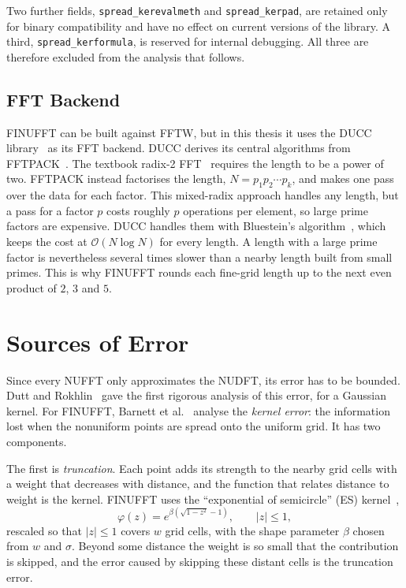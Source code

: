 Two further fields, \texttt{spread\_kerevalmeth} and \texttt{spread\_kerpad},
are retained only for binary compatibility and have no effect on current
versions of the library. A third, \texttt{spread\_kerformula}, is reserved for
internal debugging. All three are therefore excluded from the analysis that
follows.

\subsection{FFT Backend}
\label{sec:related_ducc}

FINUFFT can be built against FFTW, but in this thesis it uses the DUCC library~\cite{ducc} as its FFT backend. DUCC derives its central algorithms from FFTPACK~\cite{fftpack}. The textbook radix-2 FFT~\cite{cooley1965} requires the length to be a power of two. FFTPACK instead factorises the length, $N = p_1 p_2 \cdots p_k$, and makes one pass over the data for each factor. This mixed-radix approach handles any length, but a pass for a factor $p$ costs roughly $p$ operations per element, so large prime factors are expensive. DUCC handles them with Bluestein's algorithm~\cite{bluestein1970}, which keeps the cost at $\mathcal{O}(N \log N)$ for every length. A length with a large prime factor is nevertheless several times slower than a nearby length built from small primes. This is why FINUFFT rounds each fine-grid length up to the next even product of $2$, $3$ and $5$.

\section{Sources of Error}
\label{sec:nufft_error}

Since every NUFFT only approximates the NUDFT, its error has to be bounded.
Dutt and Rokhlin~\cite{dutt1993} gave the first rigorous analysis of this
error, for a Gaussian kernel. For FINUFFT, Barnett et
al.~\cite{barnett2019,barnett2021aliasing} analyse the \emph{kernel error}:
the information lost when the nonuniform points are spread onto the uniform
grid. It has two components.

The first is \emph{truncation}. Each point adds its strength to the nearby
grid cells with a weight that decreases with distance, and the function that
relates distance to weight is the kernel. FINUFFT uses the \enquote{exponential
of semicircle} (ES) kernel~\cite{barnett2019},
\begin{equation}
    \varphi(z) = e^{\beta\left(\sqrt{1 - z^2} - 1\right)}, \qquad |z| \le 1,
    \label{eq:es_kernel}
\end{equation}
rescaled so that $|z| \le 1$ covers $w$ grid cells, with the shape parameter
$\beta$ chosen from $w$ and $\sigma$. Beyond some distance the weight is so
small that the contribution is skipped, and the error caused by skipping these
distant cells is the truncation error.


